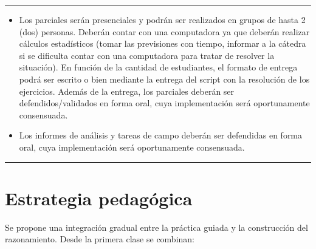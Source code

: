 \documentclass[
  spanish,
  letterpaper,
  DIV=11,
  numbers=noendperiod]{scrreprt}
\begin{document}
\begin{center}\rule{0.5\linewidth}{0.5pt}\end{center}

\begin{tcolorbox}[enhanced jigsaw, arc=.35mm, bottomrule=.15mm, bottomtitle=1mm, breakable, colback=white, colbacktitle=quarto-callout-warning-color!10!white, colframe=quarto-callout-warning-color-frame, coltitle=black, left=2mm, leftrule=.75mm, opacityback=0, opacitybacktitle=0.6, rightrule=.15mm, title=\textcolor{quarto-callout-warning-color}{\faExclamationTriangle}\hspace{0.5em}{Modalidad de las evaluaciones}, titlerule=0mm, toprule=.15mm, toptitle=1mm]

\begin{itemize}
\item
  Los parciales serán presenciales y podrán ser realizados en grupos de
  hasta 2 (dos) personas. Deberán contar con una computadora ya que
  deberán realizar cálculos estadísticos (tomar las previsiones con
  tiempo, informar a la cátedra si se dificulta contar con una
  computadora para tratar de resolver la situación). En función de la
  cantidad de estudiantes, el formato de entrega podrá ser escrito o
  bien mediante la entrega del script con la resolución de los
  ejercicios. Además de la entrega, los parciales deberán ser
  defendidos/validados en forma oral, cuya implementación será
  oportunamente consensuada.
\item
  Los informes de análisis y tareas de campo deberán ser defendidas en
  forma oral, cuya implementación será oportunamente consensuada.
\end{itemize}

\end{tcolorbox}

\begin{center}\rule{0.5\linewidth}{0.5pt}\end{center}

\section{Estrategia pedagógica}\label{estrategia-pedaguxf3gica}

Se propone una integración gradual entre la práctica guiada y la
construcción del razonamiento. Desde la primera clase se combinan:
\end{document}
